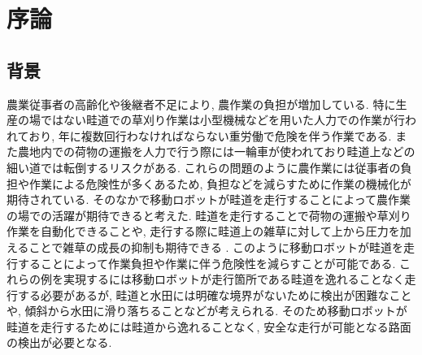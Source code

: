 \chapter{序論}
\section{背景}
農業従事者の高齢化や後継者不足により, 農作業の負担が増加している. 
特に生産の場ではない畦道での草刈り作業は小型機械などを用いた人力での作業が行われており, 年に複数回行わなければならない重労働で危険を伴う作業である. 
また農地内での荷物の運搬を人力で行う際には一輪車が使われており畦道上などの細い道では転倒するリスクがある. 
これらの問題のように農作業には従事者の負担や作業による危険性が多くあるため, 負担などを減らすために作業の機械化が期待されている.
そのなかで移動ロボットが畦道を走行することによって農作業の場での活躍が期待できると考えた. 
畦道を走行することで荷物の運搬や草刈り作業を自動化できることや, 走行する際に畦道上の雑草に対して上から圧力を加えることで雑草の成長の抑制も期待できる\cite{長橋孝哉2019ニューラルネットワークを用いた畦道の雑草検出に関する研究}
. 
このように移動ロボットが畦道を走行することによって作業負担や作業に伴う危険性を減らすことが可能である. 
これらの例を実現するには移動ロボットが走行箇所である畦道を逸れることなく走行する必要があるが, 畦道と水田には明確な境界がないために検出が困難なことや, 傾斜から水田に滑り落ちることなどが考えられる. 
そのため移動ロボットが畦道を走行するためには畦道から逸れることなく, 安全な走行が可能となる路面の検出が必要となる.


%
